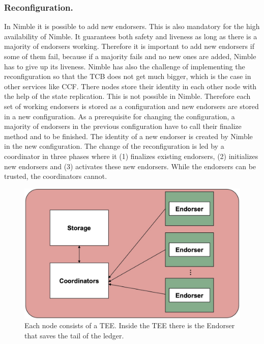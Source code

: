 	\subsubsection*{Reconfiguration.}
	In Nimble it is possible to add new endorsers. This is also mandatory for the high availability of Nimble. It guarantees both safety and liveness as long as there is a majority of endorsers working. Therefore it is important to add new endorsers if some of them fail, because if a majority fails and no new ones are added, Nimble has to give up its liveness. Nimble has also the challenge of implementing the reconfiguration so that the TCB does not get much bigger, which is the case in other services like CCF. There nodes store their identity in each other node with the help of the state replication. This is not possible in Nimble. Therefore each set of working endorsers is stored as a configuration and new endorsers are stored in a new configuration. As a prerequisite for changing the configuration, a majority of endorsers in the previous configuration have to call their finalize method and to be finished. The identity of a new endorser is created by Nimble in the new configuration. The change of the reconfiguration is led by a coordinator in three phases where it (1) finalizes existing endorsers, (2) initializes new endorsers and (3) activates these new endorsers. While the endorsers can be trusted, the coordinators cannot. 
	
\begin{figure}[b]
	\includegraphics[scale=0.14]{pictures/nimble}
	\caption{Each node consists of a TEE. Inside the TEE there is the Endorser that saves the tail of the ledger.}
	\label{nimble}
\end{figure}
